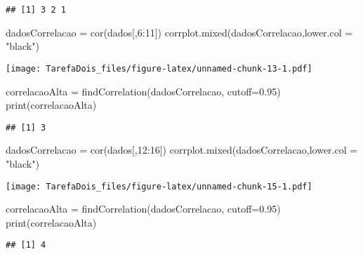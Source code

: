 \documentclass[
]{article}
\newenvironment{Shaded}{\begin{snugshade}}{\end{snugshade}}
\newcommand{\AttributeTok}[1]{\textcolor[rgb]{0.77,0.63,0.00}{#1}}
\newcommand{\DecValTok}[1]{\textcolor[rgb]{0.00,0.00,0.81}{#1}}
\newcommand{\FloatTok}[1]{\textcolor[rgb]{0.00,0.00,0.81}{#1}}
\newcommand{\FunctionTok}[1]{\textcolor[rgb]{0.00,0.00,0.00}{#1}}
\newcommand{\NormalTok}[1]{#1}
\newcommand{\OtherTok}[1]{\textcolor[rgb]{0.56,0.35,0.01}{#1}}
\newcommand{\SpecialCharTok}[1]{\textcolor[rgb]{0.00,0.00,0.00}{#1}}
\newcommand{\StringTok}[1]{\textcolor[rgb]{0.31,0.60,0.02}{#1}}
\begin{document}
\begin{verbatim}
## [1] 3 2 1
\end{verbatim}

\begin{Shaded}
\begin{Highlighting}[]
\NormalTok{dadosCorrelacao }\OtherTok{=} \FunctionTok{cor}\NormalTok{(dados[,}\DecValTok{6}\SpecialCharTok{:}\DecValTok{11}\NormalTok{])}
\FunctionTok{corrplot.mixed}\NormalTok{(dadosCorrelacao,}\AttributeTok{lower.col =} \StringTok{"black"}\NormalTok{)}
\end{Highlighting}
\end{Shaded}

\texttt{[image: TarefaDois\_files/figure-latex/unnamed-chunk-13-1.pdf]}

\begin{Shaded}
\begin{Highlighting}[]
\NormalTok{correlacaoAlta }\OtherTok{=} \FunctionTok{findCorrelation}\NormalTok{(dadosCorrelacao, }\AttributeTok{cutoff=}\FloatTok{0.95}\NormalTok{)}
\FunctionTok{print}\NormalTok{(correlacaoAlta)}
\end{Highlighting}
\end{Shaded}

\begin{verbatim}
## [1] 3
\end{verbatim}

\begin{Shaded}
\begin{Highlighting}[]
\NormalTok{dadosCorrelacao }\OtherTok{=} \FunctionTok{cor}\NormalTok{(dados[,}\DecValTok{12}\SpecialCharTok{:}\DecValTok{16}\NormalTok{])}
\FunctionTok{corrplot.mixed}\NormalTok{(dadosCorrelacao,}\AttributeTok{lower.col =} \StringTok{"black"}\NormalTok{)}
\end{Highlighting}
\end{Shaded}

\texttt{[image: TarefaDois\_files/figure-latex/unnamed-chunk-15-1.pdf]}

\begin{Shaded}
\begin{Highlighting}[]
\NormalTok{correlacaoAlta }\OtherTok{=} \FunctionTok{findCorrelation}\NormalTok{(dadosCorrelacao, }\AttributeTok{cutoff=}\FloatTok{0.95}\NormalTok{)}
\FunctionTok{print}\NormalTok{(correlacaoAlta)}
\end{Highlighting}
\end{Shaded}

\begin{verbatim}
## [1] 4
\end{verbatim}
\end{document}
